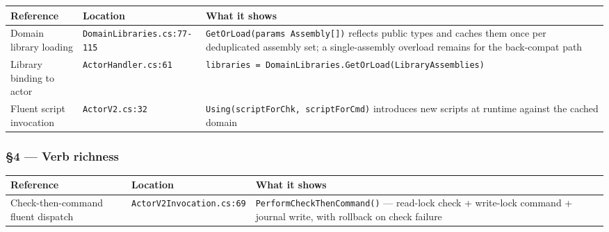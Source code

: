 \documentclass[
]{article}
\newcounter{none} %
\let\origtexttt\texttt%
\renewcommand{\texttt}[1]{\origtexttt{\seqsplit{#1}}}%
\let\texttt\origtexttt%
\begin{document}
{\def\LTcaptype{none} %
\begin{longtable}[]{@{}
  >{\raggedright\arraybackslash}p{}
  >{\raggedright\arraybackslash}p{}
  >{\raggedright\arraybackslash}p{}@{}}
\toprule\noalign{}
\begin{minipage}[b]{\linewidth}\raggedright
Reference
\end{minipage} & \begin{minipage}[b]{\linewidth}\raggedright
Location
\end{minipage} & \begin{minipage}[b]{\linewidth}\raggedright
What it shows
\end{minipage} \\
\midrule\noalign{}
\endhead
\bottomrule\noalign{}
\endlastfoot
Domain library loading & \texttt{DomainLibraries.cs:77-115} &
\texttt{GetOrLoad(params\ Assembly{[}{]})} reflects public types and
caches them once per deduplicated assembly set; a single-assembly
overload remains for the back-compat path \\
Library binding to actor & \texttt{ActorHandler.cs:61} &
\texttt{libraries\ =\ DomainLibraries.GetOrLoad(LibraryAssemblies)} \\
Fluent script invocation & \texttt{ActorV2.cs:32} &
\texttt{Using(scriptForChk,\ scriptForCmd)} introduces new scripts at
runtime against the cached domain \\
\end{longtable}
}

\subsubsection{§4 --- Verb richness}\label{verb-richness-1}

{\def\LTcaptype{none} %
\begin{longtable}[]{@{}
  >{\raggedright\arraybackslash}p{}
  >{\raggedright\arraybackslash}p{}
  >{\raggedright\arraybackslash}p{}@{}}
\toprule\noalign{}
\begin{minipage}[b]{\linewidth}\raggedright
Reference
\end{minipage} & \begin{minipage}[b]{\linewidth}\raggedright
Location
\end{minipage} & \begin{minipage}[b]{\linewidth}\raggedright
What it shows
\end{minipage} \\
\midrule\noalign{}
\endhead
\bottomrule\noalign{}
\endlastfoot
Check-then-command fluent dispatch & \texttt{ActorV2Invocation.cs:69} &
\texttt{PerformCheckThenCommand()} --- read-lock check + write-lock
command + journal write, with rollback on check failure \\
\end{longtable}
}
\end{document}
